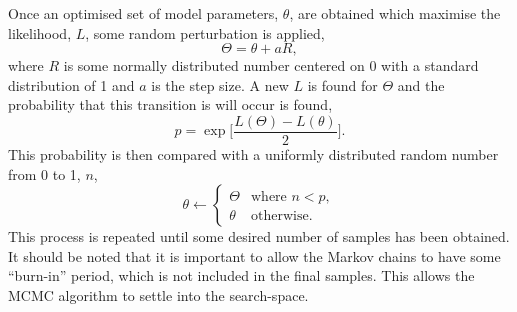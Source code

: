 \documentclass[
 reprint,
 superscriptaddress,
 amsmath,amssymb,
 aps,
]{revtex4-1}
\begin{document}
Once an optimised set of model parameters, $\theta$, are obtained which maximise the likelihood, $L$, some random perturbation is applied, 
%
\begin{equation}
    \Theta = \theta + aR,
\end{equation}
%
where $R$ is some normally distributed number centered on \num{0} with a standard distribution of \num{1} and $a$ is the step size. 
A new $L$ is found for $\Theta$ and the probability that this transition is will occur is found, 
%
\begin{equation}
    p = \exp{\bigg[\frac{L(\Theta) - L(\theta)}{2}\bigg]}. 
\end{equation}
%
This probability is then compared with a uniformly distributed random number from \num{0} to \num{1}, $n$,
%
\begin{equation}
    \theta \leftarrow
    \begin{cases}
        \Theta & \text{where } n < p,\\
        \theta & \text{otherwise}.
    \end{cases}
\end{equation}
%
This process is repeated until some desired number of samples has been obtained. 
It should be noted that it is important to allow the Markov chains to have some ``burn-in'' period, which is not included in the final samples. 
This allows the MCMC algorithm to settle into the search-space. 
\end{document}
